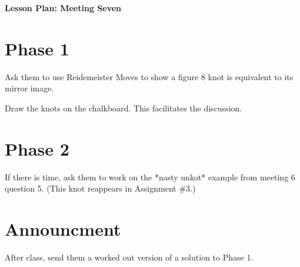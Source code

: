 \documentclass[12pt]{amsart}
\theoremstyle{definition}
\begin{document}
\begin{center}
\textbf{\Huge
Lesson Plan: Meeting Seven
}
\end{center}
\vspace{.5in}

\section*{Phase 1}
Ask them to use Reidemeister Moves to show a figure 8 knot is equivalent to its mirror image.

Draw the knots on the chalkboard. This facilitates the discussion.

\section*{Phase 2}
If there is time, ask them to work on the *nasty unkot* example from meeting 6 question 5. (This knot reappears in Assignment \#3.)

\section*{Announcment}
After class, send them a worked out version of a solution to Phase 1.
\end{document}

